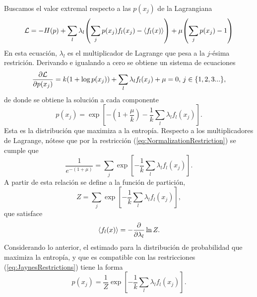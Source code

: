 Buscamos el valor extremal respecto a las $p(x_{j})$ de la Lagrangiana
\begin{equation}
    \mathcal{L}=-H(p)+\sum_{l}\lambda_{l}\qty(\sum_{j}p(x_{j})f_{l}(x_{j})-\expval{f_{l}(x)})+\mu\qty(\sum_{j}p(x_{j})-1)\nonumber
\end{equation}
En esta ecuación, $\lambda_{l}$ es el multiplicador de Lagrange que pesa a la $j$-ésima restrición. Derivando e igualando a cero se obtiene un sistema de ecuaciones
\begin{equation}
    \frac{\partial \mathcal{L}}{\partial p(x_{j})}=k(1+\log{p(x_{j})})+\sum_{l}\lambda_{l}f_{l}(x_{j})+\mu=0,\, j\in\{1,2,3...\},\nonumber
\end{equation}
de donde se obtiene la solución a cada componente
\begin{equation}
    p(x_{j})=\exp[-(1+\frac{\mu}{k})-\frac{1}{k}\sum_{l}\lambda_{l}f_{l}(x_{j})].\nonumber
\end{equation}
Esta es la distribución que maximiza a la entropía. Respecto a los multiplicadores de Lagrange, nótese que por la restricción (\ref{eq:NormalizationRestriction}) se cumple que
\begin{equation}
    \frac{1}{e^{-(1+\mu)}}=\sum_{j}\exp[-\frac{1}{k}\sum_{l}\lambda_{l}f_{l}(x_{j})].\nonumber
\end{equation}
A partir de esta relación se define a la función de partición,
\begin{equation}
    Z=\sum_{j}\exp[-\frac{1}{k}\sum_{l}\lambda_{l}f_{l}(x_{j})],\nonumber
\end{equation}
que satisface
\begin{equation}
    \expval{f_{l}(x)}=-\frac{\partial}{\partial \lambda_{l}}\ln{Z}.\nonumber
\end{equation}
Considerando lo anterior, el estimado para la distribución de probabilidad que maximiza la entropía, y que es compatible con las restricciones (\ref{eq:JaynesRestrictions}) tiene la forma 
\begin{equation}\label{eq:MaxEntDist}
    p(x_{j})=\frac{1}{Z}\exp[-\frac{1}{k}\sum_{l}\lambda_{l}f_{l}(x_{j})].
\end{equation}

\subsubsection{}

